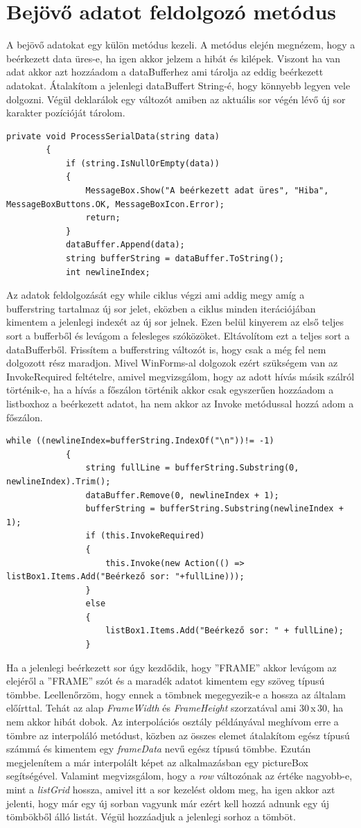 \documentclass[]{thesis-ekf}
\theoremstyle{definition}
\theoremstyle{remark}
\begin{document}
	\section{Bejövő adatot feldolgozó metódus}
	A bejövő adatokat egy külön metódus kezeli. A metódus elején megnézem, hogy a beérkezett data üres-e, ha igen akkor jelzem a hibát és kilépek. Viszont ha van adat akkor azt hozzáadom a dataBufferhez ami tárolja az eddig beérkezett adatokat. Átalakítom a jelenlegi dataBuffert String-é, hogy könnyebb legyen vele dolgozni. Végül deklarálok egy változót amiben az aktuális sor végén lévő új sor karakter pozícióját tárolom.
	\begin{lstlisting}[language=CSharp, basicstyle=\small]
		private void ProcessSerialData(string data)
		{
			if (string.IsNullOrEmpty(data))
			{
				MessageBox.Show("A beérkezett adat üres", "Hiba", MessageBoxButtons.OK, MessageBoxIcon.Error);
				return;
			}
			dataBuffer.Append(data); 
			string bufferString = dataBuffer.ToString();
			int newlineIndex;
		\end{lstlisting}
		Az adatok feldolgozását egy while ciklus végzi ami addig megy amíg a bufferstring tartalmaz új sor jelet, eközben a ciklus minden iterációjában kimentem a jelenlegi indexét az új sor jelnek. Ezen belül kinyerem az első teljes sort a bufferből és levágom a felesleges szóközöket. Eltávolítom ezt a teljes sort a dataBufferből. Frissítem a bufferstring változót is, hogy csak a még fel nem dolgozott rész maradjon. Mivel WinForms-al\cite{winforms} dolgozok ezért szükségem van az InvokeRequired feltételre, amivel megvizsgálom, hogy az adott hívás másik szálról történik-e, ha a hívás a főszálon történik akkor csak egyszerűen hozzáadom a listboxhoz\cite{listbox} a beérkezett adatot, ha nem akkor az Invoke metódussal hozzá adom a főszálon.
		\begin{lstlisting}[language=CSharp]
			while ((newlineIndex=bufferString.IndexOf("\n"))!= -1)
			{
				string fullLine = bufferString.Substring(0, newlineIndex).Trim(); 
				dataBuffer.Remove(0, newlineIndex + 1);
				bufferString = bufferString.Substring(newlineIndex + 1);
				if (this.InvokeRequired)
				{
					this.Invoke(new Action(() => listBox1.Items.Add("Beérkező sor: "+fullLine)));
				}
				else
				{
					listBox1.Items.Add("Beérkező sor: " + fullLine);
				}
			\end{lstlisting}
			Ha a jelenlegi beérkezett sor úgy kezdődik, hogy ''FRAME'' akkor levágom az elejéről a ''FRAME'' szót és a maradék adatot kimentem egy szöveg típusú tömbbe. Leellenőrzöm, hogy ennek a tömbnek megegyezik-e a hossza az általam előírttal. Tehát az alap \emph{FrameWidth} és \emph{FrameHeight} szorzatával ami 30\,x\,30, ha nem akkor hibát dobok. Az interpolációs osztály példányával meghívom erre a tömbre az interpoláló metódust, közben az összes elemet átalakítom egész típusú számmá és kimentem egy \emph{frameData} nevű egész típusú tömbbe. Ezután megjelenítem a már interpolált képet az alkalmazásban egy pictureBox segítségével. Valamint megvizsgálom, hogy a \emph{row} változónak az értéke nagyobb-e, mint a \emph{listGrid} hossza, amivel itt a sor kezelést oldom meg, ha igen akkor azt jelenti, hogy már egy új sorban vagyunk már ezért kell hozzá adnunk egy új tömbökből álló listát. Végül hozzáadjuk a jelenlegi sorhoz a tömböt. 
\end{document}
